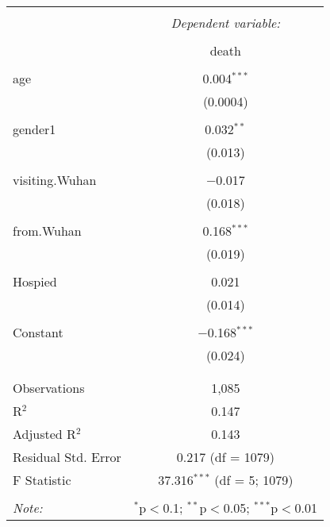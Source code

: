 \documentclass[12pt,english]{article}
\begin{document}
\begin{table}[!htbp] \centering 
  \caption{} 
  \label{} 
\begin{tabular}{@{\extracolsep{5pt}}lc} 
\\[-1.8ex]\hline 
\hline \\[-1.8ex] 
 & \multicolumn{1}{c}{\textit{Dependent variable:}} \\ 
\cline{2-2} 
\\[-1.8ex] & death \\ 
\hline \\[-1.8ex] 
 age & 0.004$^{***}$ \\ 
  & (0.0004) \\ 
  & \\ 
 gender1 & 0.032$^{**}$ \\ 
  & (0.013) \\ 
  & \\ 
 visiting.Wuhan & $-$0.017 \\ 
  & (0.018) \\ 
  & \\ 
 from.Wuhan & 0.168$^{***}$ \\ 
  & (0.019) \\ 
  & \\ 
 Hospied & 0.021 \\ 
  & (0.014) \\ 
  & \\ 
 Constant & $-$0.168$^{***}$ \\ 
  & (0.024) \\ 
  & \\ 
  \hline \\[-1.8ex] 
Observations & 1,085 \\ 
R$^{2}$ & 0.147 \\ 
Adjusted R$^{2}$ & 0.143 \\ 
Residual Std. Error & 0.217 (df = 1079) \\ 
F Statistic & 37.316$^{***}$ (df = 5; 1079) \\ 
\hline 
\hline \\[-1.8ex] 
\textit{Note:}  & \multicolumn{1}{r}{$^{*}$p$<$0.1; $^{**}$p$<$0.05; $^{***}$p$<$0.01} \\ 
\end{tabular} 
\end{table} 
\newpage
\end{document}
